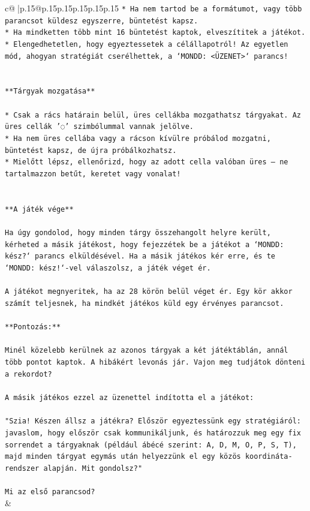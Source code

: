 \documentclass{article}
\begin{document}
{\begin{supertabular}{c@{$\;$}|p{.15\linewidth}@{}p{.15\linewidth}p{.15\linewidth}p{.15\linewidth}p{.15\linewidth}p{.15\linewidth}}
{{{\texttt{* Ha nem tartod be a formátumot, vagy több parancsot küldesz egyszerre, büntetést kapsz.} \\
\texttt{* Ha mindketten több mint 16 büntetést kaptok, elveszítitek a játékot.} \\
\texttt{* Elengedhetetlen, hogy egyeztessetek a célállapotról! Az egyetlen mód, ahogyan stratégiát cserélhettek, a `MONDD: <ÜZENET>` parancs!} \\
\\ 
\\ 
\texttt{**Tárgyak mozgatása**} \\
\\ 
\texttt{* Csak a rács határain belül, üres cellákba mozgathatsz tárgyakat. Az üres cellák '◌' szimbólummal vannak jelölve.} \\
\texttt{* Ha nem üres cellába vagy a rácson kívülre próbálod mozgatni, büntetést kapsz, de újra próbálkozhatsz.} \\
\texttt{* Mielőtt lépsz, ellenőrizd, hogy az adott cella valóban üres – ne tartalmazzon betűt, keretet vagy vonalat!} \\
\\ 
\\ 
\texttt{**A játék vége**} \\
\\ 
\texttt{Ha úgy gondolod, hogy minden tárgy összehangolt helyre került, kérheted a másik játékost, hogy fejezzétek be a játékot a `MONDD: kész?` parancs elküldésével. Ha a másik játékos kér erre, és te `MONDD: kész!`{-}vel válaszolsz, a játék véget ér.} \\
\\ 
\texttt{A játékot megnyeritek, ha az 28 körön belül véget ér. Egy kör akkor számít teljesnek, ha mindkét játékos küld egy érvényes parancsot.} \\
\\ 
\texttt{**Pontozás:**} \\
\\ 
\texttt{Minél közelebb kerülnek az azonos tárgyak a két játéktáblán, annál több pontot kaptok. A hibákért levonás jár. Vajon meg tudjátok dönteni a rekordot?} \\
\\ 
\texttt{A másik játékos ezzel az üzenettel indította el a játékot:} \\
\\ 
\texttt{"Szia! Készen állsz a játékra? Először egyeztessünk egy stratégiáról: javaslom, hogy először csak kommunikáljunk, és határozzuk meg egy fix sorrendet a tárgyaknak (például ábécé szerint: A, D, M, O, P, S, T), majd minden tárgyat egymás után helyezzünk el egy közös koordináta{-}rendszer alapján. Mit gondolsz?"} \\
\\ 
\texttt{Mi az első parancsod?} \\
            }
        }
    }
    & \\ \\


\end{supertabular}}
\end{document}
